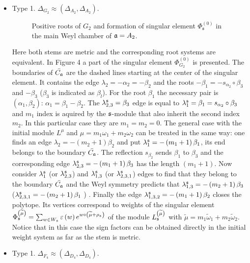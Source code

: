 \begin{itemize}
\item
Type 1. $\Delta _{G_{2}}\approx (\Delta _{A_{2}},\Delta
_{A_{2}}).$

 \begin{figure}[h!bt]
  \noindent{}
  \caption{Positive roots of $G_{2}$ and formation of singular element $\Phi^{(0)}_{\mathfrak{s}}$ in the main Weyl chamber of $\mathfrak{a}=A_{2}$.}
\end{figure}
Here both stems are metric and the corresponding root systems are
equivalent. In Figure 4 a part of the singular element $\Phi
_{G_{2}}^{\left( 0\right) }$ is presented. The boundaries of $\bar{C_{\frak{a%
}}}$ are the dashed lines starting at the center of the singular
element. It
contains the edge $\lambda _{2}=-\alpha _{2}=-\beta _{2}$ and the roots $%
-\beta _{1}=-s_{\alpha _{2}}\circ \beta _{3}$ and $ -\beta _{3}$
($\beta _{3}$ is indicated as $\beta _{l}$). For the root $\beta
_{1}$ the necessary pair
is  $(\alpha _{1}, \beta _{2})$: $\alpha _{1}=\beta _{1}-\beta _{2}$. The $%
\lambda _{2,3}^{\frak{s}}=\beta _{3}$ edge is equal to $\lambda _{1}^{\frak{s%
}}=\beta _{1}=s_{\alpha _{2}}\circ \beta _{3}$ and $m_{1}$ index
is aquired by the $\frak{s}$-module that also inherit the second
index $m_{2}$. In this particular
case they are $m_{1}=m_{2}=0$. The general case with the initial module $%
L^{\mu }$ and $\mu =m_{1}\omega _{1}+m_{2}\omega _{2}$ can be
treated in the same way: one finds an edge $\lambda _{2}=-\left(
m_{2}+1\right) \beta _{2}$ and put $\lambda
_{1}^{\frak{s}}=-\left( m_{1}+1\right) \beta _{1}$, its end
belongs to the boundary $\bar{C_{\mathfrak{a}}}$. The reflection
$s_{\beta
_{2}} $ sends $\beta _{1}$ to $\beta _{3}$ and the corresponding edge 
$\lambda _{2,3}^{\frak{s}}=-\left( m_{1}+1\right) \beta _{3}$ has
the length $\left( m_{1}+1\right) $. Now consider $\lambda _{1}^{\frak{s}}$ (or
$\lambda _{2,3}^{\frak{s}} $) and $\lambda _{1,3}^{\frak{s}}$ (or
$\lambda _{2,3,1}^{\frak{s}}$) edges to find that they belong to
the boundary $\bar{C_{\mathfrak{a}}}$ and the Weyl symmetry predicts
that $\lambda _{1,3}^{\frak{s}}=-\left( m_{2}+1\right)
\beta _{3}$ ($\lambda _{2,3,1}^{\frak{s}}=-\left( m_{2}+1\right) \beta _{1}$%
) . Finally the edge $\lambda _{1,3,2}^{\frak{s}}=-\left(
m_{1}+1\right) \beta _{2}$ closes the polytope. Its vertices
correspond to weights of the singular
element $\Phi _{\frak{s}}^{\left( \widetilde{\mu }\right) }=\sum_{w\in W_{%
\frak{s}}}\varepsilon \left( w\right) e^{w\circ \left(
\widetilde{\mu }+\rho
_{\frak{s}}\right) }$ of the module $L_{\frak{s}}^{\left( \widetilde{\mu }%
\right) }$ with $\widetilde{\mu }=m_{1}\widetilde{\omega }_{1}+m_{2}%
\widetilde{\omega }_{2}$. Notice that in this case the sign
factors can be obtained directly in the initial weight system as
far as the stem is metric.
\item
Type 1. $\Delta _{F_{4}}\approx (\Delta _{D_{4}},\Delta
_{D_{4}}).$


\end{itemize}
